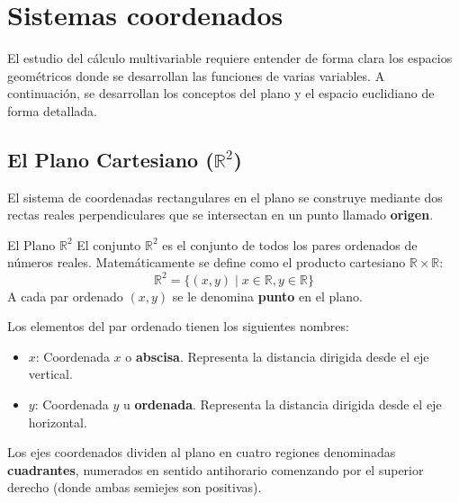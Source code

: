 \section{Sistemas coordenados}

El estudio del cálculo multivariable requiere entender de forma clara los espacios geométricos donde se desarrollan las funciones de varias variables. A continuación, se desarrollan los conceptos del plano y el espacio euclidiano de forma detallada.

\subsection{El Plano Cartesiano ($\mathbb{R}^2$)}

El sistema de coordenadas rectangulares en el plano se construye mediante dos rectas reales perpendiculares que se intersectan en un punto llamado \textbf{origen}.

\begin{mydefinition}{El Plano $\mathbb{R}^2$}
El conjunto $\mathbb{R}^2$ es el conjunto de todos los pares ordenados de números reales. Matemáticamente se define como el producto cartesiano $\mathbb{R} \times \mathbb{R}$:
$$ \mathbb{R}^2 = \{ (x, y) \mid x \in \mathbb{R}, y \in \mathbb{R} \} $$
A cada par ordenado $(x, y)$ se le denomina \textbf{punto} en el plano.
\end{mydefinition}

Los elementos del par ordenado tienen los siguientes nombres:
\begin{itemize}
    \item $x$: Coordenada $x$ o \textbf{abscisa}. Representa la distancia dirigida desde el eje vertical.
    \item $y$: Coordenada $y$ u \textbf{ordenada}. Representa la distancia dirigida desde el eje horizontal.
\end{itemize}

Los ejes coordenados dividen al plano en cuatro regiones denominadas \textbf{cuadrantes}, numerados en sentido antihorario comenzando por el superior derecho (donde ambas semiejes son positivas).

\begin{center}
\shorthandoff{>}
\end{center}

